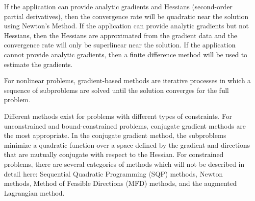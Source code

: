 If the application can provide analytic gradients and Hessians (second-order partial derivatives), then the convergence rate will be quadratic near the solution using Newton's Method.
If the application can provide analytic gradients but not Hessians, then the Hessians are approximated from the gradient data and the convergence rate will only be superlinear near the solution.
If the application cannot provide analytic gradients, then a finite difference method will be used to estimate the gradients.

For nonlinear problems, gradient-based methods are iterative processes in which a sequence of subproblems are solved until the solution converges for the full problem.

Different methods exist for problems with different types of constraints.
For unconstrained and bound-constrained problems, conjugate gradient methods are the most appropriate.
In the conjugate gradient method, the subproblems minimize a quadratic function over a space defined by the gradient and directions that are mutually conjugate with respect to the Hessian.
For constrained problems, there are several categories of methods which will not be described in detail here: Sequential Quadratic Programming (SQP) methods, Newton methods, Method of Feasible Directions (MFD) methods, and the augmented Lagrangian method.

